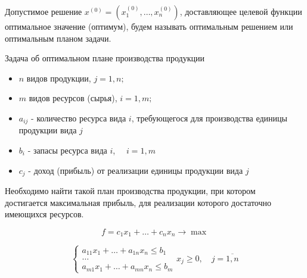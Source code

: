 \documentclass[17pt]{extarticle}
\begin{document}
\begin{definition}
    Допустимое решение \( x^{(0)} = (x_1^{(0)}, \ldots, x_n^{(0)}) \),
    доставляющее целевой функции оптимальное значение (оптимум),
    будем называть оптимальным решением или оптимальным планом задачи.
\end{definition}

\begin{definition}
    Задача об оптимальном плане производства продукции
    \begin{itemize}
        \item $n$ видов продукции, $j = 1, n;$
        \item $m$ видов ресурсов (сырья), $i = 1, m;$
        \item $a_{ij}$ - количество ресурса вида $i$, требующегося для производства единицы продукции вида $j$
        \item $b_i$ - запасы ресурса вида $i$, $\quad i = 1, m$
        \item $c_j$ - доход (прибыль) от реализации единицы продукции вида $j$
    \end{itemize}
    Необходимо найти такой план производства продукции, при котором \\ достигается максимальная прибыль,
    для реализации которого достаточно имеющихся ресурсов.

    \[
        f = c_1 x_1 + \ldots + c_n x_n \rightarrow \max
    \]

    \[
        \begin{cases}
            a_{11} x_1 + \ldots + a_{1n} x_n \leq b_1 \\
            \ldots                                    \\
            a_{m1} x_1 + \ldots + a_{mn} x_n \leq b_m
        \end{cases} x_j \geq 0, \quad j = \overline{1, n}
    \]
\end{definition}
\end{document}
